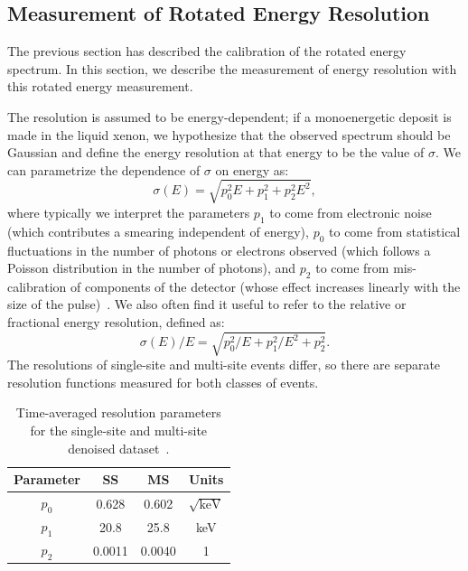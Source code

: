 \subsection{Measurement of Rotated Energy Resolution}\label{sec:RotatedEnergyResMeasurement}

The previous section has described the calibration of the rotated energy spectrum.  In this section, we describe the measurement of energy resolution with this rotated energy measurement.

The resolution is assumed to be energy-dependent; if a monoenergetic deposit is made in the liquid xenon, we hypothesize that the observed spectrum should be Gaussian and define the energy resolution at that energy to be the value of $\sigma$.  We can parametrize the dependence of $\sigma$ on energy as:
\begin{equation}\label{eqn:ResolutionAbsoluteFunctionForm}
\sigma(E) = \sqrt{p_0^2 E + p_1^2 + p_2^2 E^2},
\end{equation}
where typically we interpret the parameters $p_1$ to come from electronic noise (which contributes a smearing independent of energy), $p_0$ to come from statistical fluctuations in the number of photons or electrons observed (which follows a Poisson distribution in the number of photons), and $p_2$ to come from mis-calibration of components of the detector (whose effect increases linearly with the size of the pulse)~\cite{knoll2000radiation}.  We also often find it useful to refer to the relative or fractional energy resolution, defined as:
\begin{equation}
\sigma(E)/E = \sqrt{p_0^2/E + p_1^2/E^2 + p_2^2}.
\end{equation}
The resolutions of single-site and multi-site events differ, so there are separate resolution functions measured for both classes of events.

\begin{table}
\begin{center}
\begin{tabular}{|c|c|c|c|}
\hline Parameter & SS & MS & Units\\
\hline $p_0$ & 0.628 & 0.602 & $\sqrt{\text{keV}}$ \\
\hline $p_1$ & 20.8 & 25.8 & keV\\
\hline $p_2$ & 0.0011 & 0.0040 & 1 \\ \hline
\end{tabular}
\end{center}
\caption{Time-averaged resolution parameters for the single-site and multi-site denoised dataset~\cite{AverageEnergyResolutionDocument}.}
\label{tab:ResolutionFunctions_DenoisedOnly}
\end{table}

